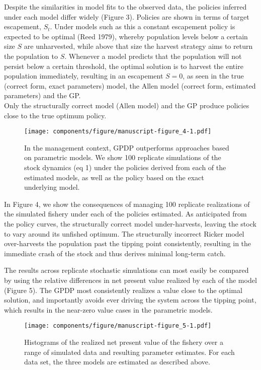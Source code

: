 \documentclass[author-year, 12pt,review]{components/elsarticle} %
\makeatletter
\def\maxwidth{\ifdim\Gin@nat@width>\linewidth\linewidth
\else\Gin@nat@width\fi}
\let\Oldincludegraphics\includegraphics
\renewcommand{\includegraphics}[1]{\Oldincludegraphics[width=\maxwidth]{#1}}
\makeatother
\begin{document}
Despite the similarities in model fits to the observed data, the
policies inferred under each model differ widely (Figure 3). Policies
are shown in terms of target escapement, $S_t$. Under models such as
this a constant escapement policy is expected to be optimal (Reed 1979),
whereby population levels below a certain size $S$ are unharvested,
while above that size the harvest strategy aims to return the population
to $S$. Whenever a model predicts that the population will not persist
below a certain threshold, the optimal solution is to harvest the entire
population immediately, resulting in an escapement $S=0$, as seen in the
true (correct form, exact parameters) model, the Allen model (correct
form, estimated parameters) and the GP.\\Only the structurally correct
model (Allen model) and the GP produce policies close to the true
optimum policy.

\begin{figure}[htbp]
\centering
\texttt{[image: components/figure/manuscript-figure\_4-1.pdf]}
\caption{In the management context, GPDP outperforms approaches based on
parametric models. We show 100 replicate simulations of the stock
dynamics (eq 1) under the policies derived from each of the estimated
models, as well as the policy based on the exact underlying model.}
\end{figure}

In Figure 4, we show the consequences of managing 100 replicate
realizations of the simulated fishery under each of the policies
estimated. As anticipated from the policy curves, the structurally
correct model under-harvests, leaving the stock to vary around its
unfished optimum. The structurally incorrect Ricker model over-harvests
the population past the tipping point consistently, resulting in the
immediate crash of the stock and thus derives minimal long-term catch.

The results across replicate stochastic simulations can most easily be
compared by using the relative differences in net present value realized
by each of the model (Figure 5). The GPDP most consistently realizes a
value close to the optimal solution, and importantly avoids ever driving
the system across the tipping point, which results in the near-zero
value cases in the parametric models.

\begin{figure}[htbp]
\centering
\texttt{[image: components/figure/manuscript-figure\_5-1.pdf]}
\caption{Histograms of the realized net present value of the fishery
over a range of simulated data and resulting parameter estimates. For
each data set, the three models are estimated as described above.}
\end{figure}
\end{document}
